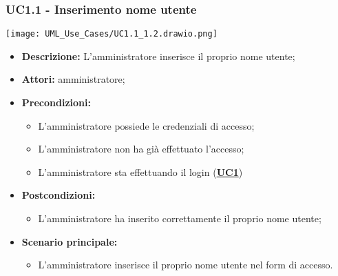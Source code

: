 \subsubsection{UC1.1 - Inserimento nome utente}
\label{sec:UC1.1}
\texttt{[image: UML\_Use\_Cases/UC1.1\_1.2.drawio.png]}
\begin{itemize}
	\item \textbf{Descrizione:} L’amministratore inserisce il proprio nome utente;
	\item \textbf{Attori:} amministratore;
	\item \textbf{Precondizioni:} 
	\begin{itemize}
		\item L’amministratore possiede le credenziali di accesso;
		\item L’amministratore non ha già effettuato l’accesso;
		\item L’amministratore sta effettuando il login (\hyperref[sec:UC1]{\textbf{UC1}})
	\end{itemize}
	\item \textbf{Postcondizioni:} 
	\begin{itemize}
		\item L’amministratore ha inserito correttamente il proprio nome utente;
	\end{itemize}
	\item \textbf{Scenario principale:} 
	\begin{itemize}
		\item L’amministratore inserisce il proprio nome utente nel form di accesso.
	\end{itemize}
\end{itemize}


